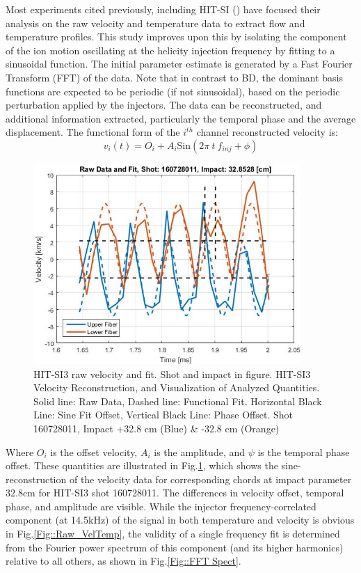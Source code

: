 \documentclass{AIAA}
\begin{document}
Most experiments cited previously, including HIT-SI (\cite{Hossack_HitSi3}) have focused their analysis on the raw velocity and temperature data to extract flow and temperature profiles. This study improves upon this by isolating the component of the ion motion oscillating at the helicity injection frequency by fitting to a sinusoidal function. The initial parameter estimate is generated by a Fast Fourier Transform (FFT) of the data. Note that in contrast to BD, the dominant basis functions are expected to be periodic (if not sinusoidal), based on the periodic perturbation applied by the injectors. The data can be reconstructed, and additional information extracted, particularly the temporal phase and the average displacement. The functional form of the $i^{th}$ channel reconstructed velocity is:
\begin{equation}\label{Eqn::Fit_Fn}
v_i(t)=O_i+A_i\mathrm{Sin}(2{\pi}\:t\:f_{inj}+\phi)
\end{equation}
\begin{figure}
\includegraphics[width=4in]{ReconstExplain}\caption{HIT-SI3 raw velocity and fit. Shot and impact in figure. 
HIT-SI3 Velocity Reconstruction, and Visualization of Analyzed Quantities. Solid line: Raw Data, Dashed line: Functional Fit. Horizontal Black Line: Sine Fit Offset, Vertical Black Line: Phase Offset. Shot 160728011, Impact +32.8 cm (Blue) \& -32.8 cm (Orange) }\label{Fig::Reconst Explain}
\end{figure}
Where $O_i$ is the offset velocity, $A_i$ is the amplitude, and $\psi$ is the temporal phase offset. These quantities are illustrated in Fig.\ref{Fig::Reconst Explain}, which shows the sine-reconstruction of the velocity data for corresponding chords at impact parameter 32.8cm for HIT-SI3 shot 160728011. The differences in velocity offset, temporal phase, and amplitude are visible. While the injector frequency-correlated component (at 14.5kHz) of the signal in both temperature and velocity is obvious in Fig.\ref{Fig::Raw_VelTemp}, the validity of a single frequency fit is determined from the Fourier power spectrum of this component (and its higher harmonics) relative to all others, as shown in Fig.\ref{Fig::FFT Spect}.
\end{document}
